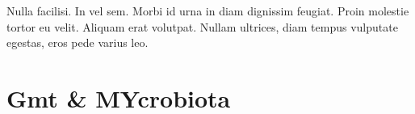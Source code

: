 \begin{savequote}[75mm]
Nulla facilisi. In vel sem. Morbi id urna in diam dignissim feugiat. Proin molestie tortor eu velit. Aliquam erat volutpat. Nullam ultrices, diam tempus vulputate egestas, eros pede varius leo.
\end{savequote}

\chapter{Gmt \& MYcrobiota}
\setcounter{figure}{-1}
\setcounter{table}{-1}
\setcounter{section}{-1}


\cite{ireport}



